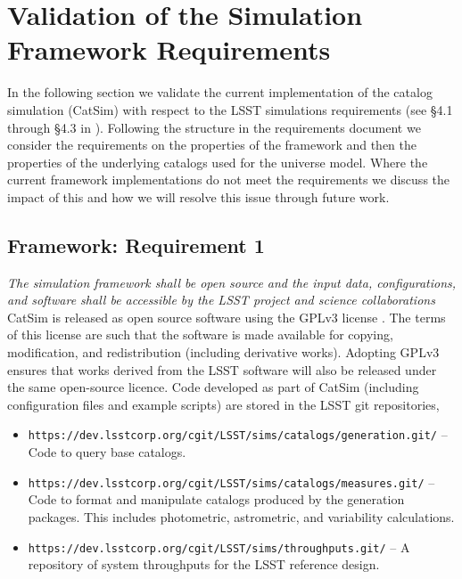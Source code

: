 \documentclass[]{article}
\begin{document}
\section{Validation of the Simulation Framework Requirements}

In the following section we validate the current implementation of the
catalog simulation (CatSim) with respect to the LSST simulations
requirements (see \S 4.1 through \S 4.3 in
\citealt{requirements}). Following the structure in the requirements
document we consider the requirements on the properties of the
framework and then the properties of the underlying catalogs used for
the universe model.  Where the current framework implementations do
not meet the requirements we discuss the impact of this and how we
will resolve this issue through future work.

\subsection{Framework: Requirement 1}

{\it  The simulation framework shall be open source and the input data, configurations,
and software shall be accessible by the LSST project and science
collaborations}\\

CatSim is released as open source software using the GPLv3 license
\citep{gpl}. The terms of this license are such that the software is
made available for copying, modification, and redistribution
(including derivative works). Adopting GPLv3 ensures that works
derived from the LSST software will also be released under the same
open-source licence. Code developed as part of CatSim (including
configuration files and example scripts) are stored in the LSST 
git repositories,

\begin{itemize}
\item {\tt https://dev.lsstcorp.org/cgit/LSST/sims/catalogs/generation.git/} -- Code to query
base catalogs.
\item {\tt https://dev.lsstcorp.org/cgit/LSST/sims/catalogs/measures.git/} -- Code to format
and manipulate catalogs produced by the generation packages.  This includes photometric, 
astrometric, and variability calculations.
\item {\tt https://dev.lsstcorp.org/cgit/LSST/sims/throughputs.git/}
  -- A repository
of system throughputs for the LSST reference design.
\end{itemize}
\end{document}
